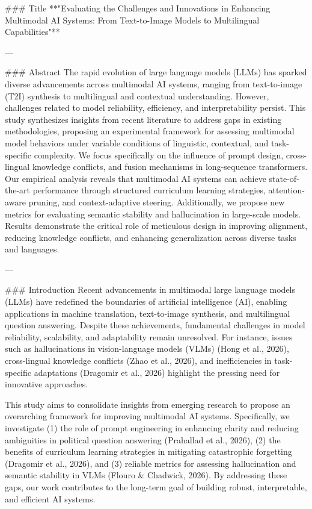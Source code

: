 ### Title  
**"Evaluating the Challenges and Innovations in Enhancing Multimodal AI Systems: From Text-to-Image Models to Multilingual Capabilities"**

---

### Abstract  
The rapid evolution of large language models (LLMs) has sparked diverse advancements across multimodal AI systems, ranging from text-to-image (T2I) synthesis to multilingual and contextual understanding. However, challenges related to model reliability, efficiency, and interpretability persist. This study synthesizes insights from recent literature to address gaps in existing methodologies, proposing an experimental framework for assessing multimodal model behaviors under variable conditions of linguistic, contextual, and task-specific complexity. We focus specifically on the influence of prompt design, cross-lingual knowledge conflicts, and fusion mechanisms in long-sequence transformers. Our empirical analysis reveals that multimodal AI systems can achieve state-of-the-art performance through structured curriculum learning strategies, attention-aware pruning, and context-adaptive steering. Additionally, we propose new metrics for evaluating semantic stability and hallucination in large-scale models. Results demonstrate the critical role of meticulous design in improving alignment, reducing knowledge conflicts, and enhancing generalization across diverse tasks and languages.  

---

### Introduction  
Recent advancements in multimodal large language models (LLMs) have redefined the boundaries of artificial intelligence (AI), enabling applications in machine translation, text-to-image synthesis, and multilingual question answering. Despite these achievements, fundamental challenges in model reliability, scalability, and adaptability remain unresolved. For instance, issues such as hallucinations in vision-language models (VLMs) (Hong et al., 2026), cross-lingual knowledge conflicts (Zhao et al., 2026), and inefficiencies in task-specific adaptations (Dragomir et al., 2026) highlight the pressing need for innovative approaches.

This study aims to consolidate insights from emerging research to propose an overarching framework for improving multimodal AI systems. Specifically, we investigate (1) the role of prompt engineering in enhancing clarity and reducing ambiguities in political question answering (Prahallad et al., 2026), (2) the benefits of curriculum learning strategies in mitigating catastrophic forgetting (Dragomir et al., 2026), and (3) reliable metrics for assessing hallucination and semantic stability in VLMs (Flouro & Chadwick, 2026). By addressing these gaps, our work contributes to the long-term goal of building robust, interpretable, and efficient AI systems.


